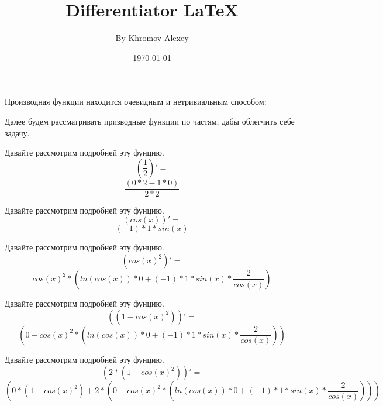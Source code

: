 \documentclass[a4paper,12pt]{article}
\author{By Khromov Alexey}
\title{Differentiator \LaTeX{}}
\date{\today}
\begin{document}
\maketitle
\newpage
Производная функции находится очевидным и нетривиальным способом:

Далее будем рассматривать призводные функции по частям, дабы облегчить себе задачу.

Давайте рассмотрим подробней эту фунцию.
\begin{equation}
\left( \frac{{1 }}{{2 }}\right)' =
\end{equation}
\begin{equation}
\frac{{\left( {{0 }* {2 }}- {{1 }* {0 }}\right) }}{{{2 }* {2 }}}
\end{equation}

Давайте рассмотрим подробней эту фунцию.
\begin{equation}
\left( cos \left( {x }\right) \right)' =
\end{equation}
\begin{equation}
{\left( -1 \right) }* {{1 }* {sin \left( {x }\right) }}
\end{equation}

Давайте рассмотрим подробней эту фунцию.
\begin{equation}
\left( {cos \left( {x }\right) }^ {2 }\right)' =
\end{equation}
\begin{equation}
{{cos \left( {x }\right) }^ {2 }}* {\left( {{ln \left( {cos \left( {x }\right) }\right) }* {0 }}+ {{{\left( -1 \right) }* {{1 }* {sin \left( {x }\right) }}}* {\frac{{2 }}{{cos \left( {x }\right) }}}}\right) }
\end{equation}

Давайте рассмотрим подробней эту фунцию.
\begin{equation}
\left( \left( {1 }- {{cos \left( {x }\right) }^ {2 }}\right) \right)' =
\end{equation}
\begin{equation}
\left( {0 }- {{{cos \left( {x }\right) }^ {2 }}* {\left( {{ln \left( {cos \left( {x }\right) }\right) }* {0 }}+ {{{\left( -1 \right) }* {{1 }* {sin \left( {x }\right) }}}* {\frac{{2 }}{{cos \left( {x }\right) }}}}\right) }}\right) 
\end{equation}

Давайте рассмотрим подробней эту фунцию.
\begin{equation}
\left( {2 }* {\left( {1 }- {{cos \left( {x }\right) }^ {2 }}\right) }\right)' =
\end{equation}
\begin{equation}
\left( {{0 }* {\left( {1 }- {{cos \left( {x }\right) }^ {2 }}\right) }}+ {{2 }* {\left( {0 }- {{{cos \left( {x }\right) }^ {2 }}* {\left( {{ln \left( {cos \left( {x }\right) }\right) }* {0 }}+ {{{\left( -1 \right) }* {{1 }* {sin \left( {x }\right) }}}* {\frac{{2 }}{{cos \left( {x }\right) }}}}\right) }}\right) }}\right) 
\end{equation}
\end{document}
